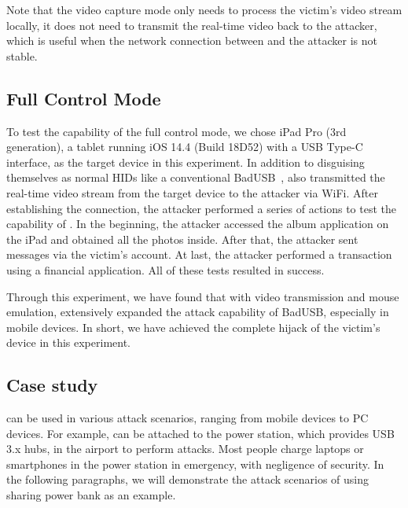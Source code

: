 Note that the video capture mode only needs to
process the victim's video stream locally, it does not need to transmit the real-time video back to the attacker, which is useful when the network connection between \tool and the attacker is not stable.

\subsection{Full Control Mode}

To test the capability of the full control mode, we chose iPad Pro (3rd generation),
a tablet running iOS 14.4 (Build 18D52) with a \ac{USB} Type-C interface,
as the target device in this experiment.
In addition to disguising themselves as normal \acp{HID} like a conventional BadUSB~\cite{badusb}, \tool also transmitted the real-time video stream from the target device to the attacker via WiFi.
After establishing the connection, the attacker performed a series of actions to test the capability of \tool.
In the beginning, the attacker accessed the album application on the iPad and obtained all the photos inside.
After that, the attacker sent messages via the victim's account. At last, the attacker performed a transaction using a financial application.
All of these tests resulted in success.

Through this experiment, we have found that with video transmission and mouse
emulation, \tool extensively expanded the attack capability of BadUSB,
especially in mobile devices. In short, we have achieved the complete hijack of the victim's
device in this experiment.

\subsection{Case study}
\label{subsec:case_study}
\tool can be used in various attack scenarios, ranging from mobile devices to PC devices.
For example, \tool can be attached to the power station, which provides USB 3.x hubs, in the airport to perform attacks.
Most people charge laptops or smartphones in the power station in emergency, with negligence of security.
In the following paragraphs, we will demonstrate the attack scenarios of \tool using sharing power bank as an example.

